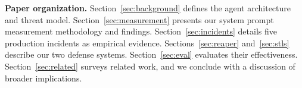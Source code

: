 \smallskip
\noindent\textbf{Paper organization.}
Section~\ref{sec:background} defines the agent architecture and threat model.
Section~\ref{sec:measurement} presents our system prompt measurement methodology and findings.
Section~\ref{sec:incidents} details five production incidents as empirical evidence.
Sections~\ref{sec:reaper} and~\ref{sec:stls} describe our two defense systems.
Section~\ref{sec:eval} evaluates their effectiveness.
Section~\ref{sec:related} surveys related work, and we conclude with a discussion of broader implications.
